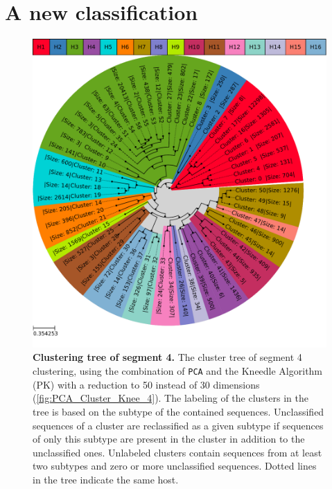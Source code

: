 \section{A new classification} \label{sec:Serotype_Classification}

\begin{figure}[!hbt]
    \centering
    \includegraphics[width=\textwidth]{Results/Clustertree_Segment_4.pdf}
    \caption[Clustering tree of segment 4]{\textbf{Clustering tree of segment 4.} The cluster tree of segment 4 clustering, using the combination of \texttt{PCA} and the Kneedle Algorithm (PK) with a reduction to 50 instead of 30 dimensions (\autoref{fig:PCA_Cluster_Knee_4}). The labeling of the clusters in the tree is based on the subtype of the contained sequences. Unclassified sequences of a cluster are reclassified as a given subtype if sequences of only this subtype are present in the cluster in addition to the unclassified ones. Unlabeled clusters contain sequences from at least two subtypes and zero or more unclassified sequences. Dotted lines in the tree indicate the same host.}
    \label{fig:Result_Clustertree_Segment_4}
\end{figure}

